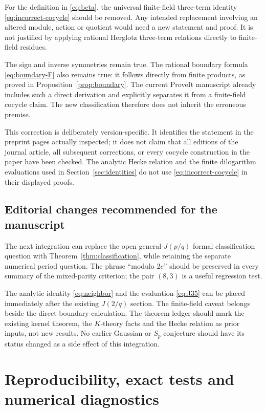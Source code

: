 \documentclass[11pt]{article}
\numberwithin{equation}{section}
\theoremstyle{definition}
\theoremstyle{remark}
\begin{document}
For the definition in \eqref{eq:beta}, the universal finite-field
three-term identity \eqref{eq:incorrect-cocycle} should be removed.
Any intended replacement involving an altered module, action or quotient
would need a new statement and proof. It is not justified by applying
rational Herglotz three-term relations directly to finite-field residues.

The sign and inverse symmetries remain true. The rational boundary
formula \eqref{eq:boundary-F} also remains true: it follows directly
from finite products, as proved in Proposition~\ref{prop:boundary}.
The current ProveIt manuscript already includes such a direct derivation
and explicitly separates it from a finite-field cocycle claim. The
new classification therefore does not inherit the erroneous premise.

This correction is deliberately version-specific. It identifies the
statement in the preprint pages actually inspected; it does not claim
that all editions of the journal article, all subsequent corrections,
or every cocycle construction in the paper have been checked. The
analytic Hecke relation and the finite dilogarithm evaluations used in
Section~\ref{sec:identities} do not use
\eqref{eq:incorrect-cocycle} in their displayed proofs.

\subsection{Editorial changes recommended for the manuscript}

The next integration can replace the open general-$J(p/q)$ formal
classification question with Theorem~\ref{thm:classification}, while
retaining the separate numerical period question. The phrase
``modulo $2e$'' should be preserved in every summary of the mixed-parity
criterion; the pair $(8,3)$ is a useful regression test.

The analytic identity \eqref{eq:neighbor} and the evaluation
\eqref{eq:J35} can be placed immediately after the existing $J(2/q)$
section. The finite-field caveat belongs beside the direct boundary
calculation. The theorem ledger should mark the existing kernel theorem,
the $K$-theory facts and the Hecke relation as prior inputs, not new
results. No earlier Gaussian or $S_p$ conjecture should have its status
changed as a side effect of this integration.


\section{Reproducibility, exact tests and numerical diagnostics}
\label{sec:verification}
\end{document}
